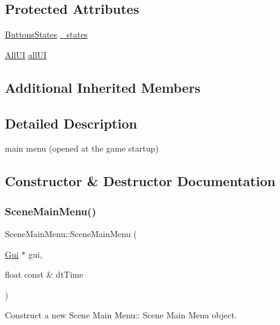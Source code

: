 \subsection*{Protected Attributes}
\begin{DoxyCompactItemize}
\item 
\hyperlink{struct_scene_main_menu_1_1_buttons_states}{Buttons\+States} \hyperlink{class_scene_main_menu_a1a9956e9fbd9a292485bc48394de910e}{\+\_\+states}
\item 
\hyperlink{struct_scene_main_menu_1_1_all_u_i}{All\+UI} \hyperlink{class_scene_main_menu_acf61b5346a1e3ea2c7e9d468838973ea}{all\+UI}
\end{DoxyCompactItemize}
\subsection*{Additional Inherited Members}


\subsection{Detailed Description}
main menu (opened at the game startup) 

\subsection{Constructor \& Destructor Documentation}
\mbox{\label{class_scene_main_menu_a7ace033e087eee777e1145c9355b7264}} 
\subsubsection{\texorpdfstring{Scene\+Main\+Menu()}{SceneMainMenu()}\hspace{0.1cm}{\footnotesize\ttfamily [1/2]}}
{\footnotesize\ttfamily Scene\+Main\+Menu\+::\+Scene\+Main\+Menu (\begin{DoxyParamCaption}\item[{\hyperlink{class_gui}{Gui} $\ast$}]{gui,  }\item[{float const \&}]{dt\+Time }\end{DoxyParamCaption})}



Construct a new Scene Main Menu\+:\+: Scene Main Menu object. 


